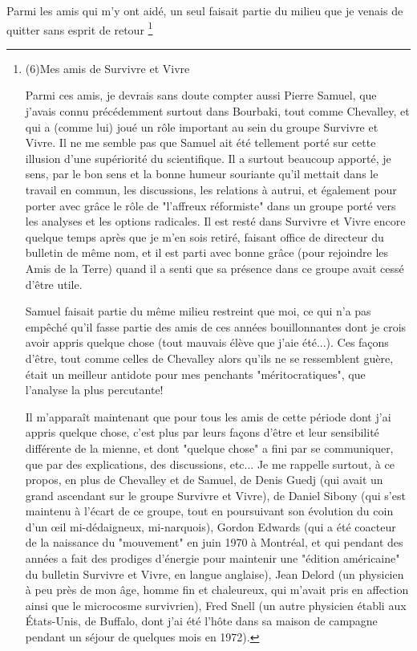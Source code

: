 Parmi les amis qui m'y ont aidé, un seul faisait partie du milieu que je venais de quitter sans esprit de retour \footnote{(6)Mes amis de Survivre et Vivre \par
Parmi ces amis, je devrais sans doute compter aussi Pierre Samuel, que j'avais connu précédemment surtout dans Bourbaki, tout comme Chevalley, et qui a (comme lui) joué un rôle important au sein du groupe Survivre et Vivre. Il ne me semble pas que Samuel ait été tellement porté sur cette illusion d'une supériorité du scientifique. Il a surtout beaucoup apporté, je sens, par le bon sens et la bonne humeur souriante qu'il mettait dans le travail en commun, les discussions, les relations à autrui, et également pour porter avec grâce le rôle de "l'affreux réformiste" dans un groupe porté vers les analyses et les options radicales. Il est resté dans Survivre et Vivre encore quelque temps après que je m'en sois retiré, faisant office de directeur du bulletin de même nom, et il est parti avec bonne grâce (pour rejoindre les Amis de la Terre) quand il a senti que sa présence dans ce groupe avait cessé d'être utile.

Samuel faisait partie du même milieu restreint que moi, ce qui n'a pas empêché qu'il fasse partie des amis de ces années bouillonnantes dont je crois avoir appris quelque chose (tout mauvais élève que j'aie été...). Ces façons d'être, tout comme celles de Chevalley alors qu'ils ne se ressemblent guère, était un meilleur antidote pour mes penchants "méritocratiques", que l'analyse la plus percutante!

Il m'apparaît maintenant que pour tous les amis de cette période dont j'ai appris quelque chose, c'est plus par leurs façons d'être et leur sensibilité différente de la mienne, et dont "quelque chose" a fini par se communiquer, que par des explications, des discussions, etc... Je me rappelle surtout, à ce propos, en plus de Chevalley et de Samuel, de Denis Guedj (qui avait un grand ascendant sur le groupe Survivre et Vivre), de Daniel Sibony (qui s'est maintenu à l'écart de ce groupe, tout en poursuivant son évolution du coin d'un œil mi-dédaigneux, mi-narquois), Gordon Edwards (qui a été coacteur de la naissance du "mouvement" en juin 1970 à Montréal, et qui pendant des années a fait des prodiges d'énergie pour maintenir une "édition américaine" du bulletin Survivre et Vivre, en langue anglaise), Jean Delord (un physicien à peu près de mon âge, homme fin et chaleureux, qui m'avait pris en affection ainsi que le microcosme survivrien), Fred Snell (un autre physicien établi aux États-Unis, de Buffalo, dont j'ai été l'hôte dans sa maison de campagne pendant un séjour de quelques mois en 1972).

}
